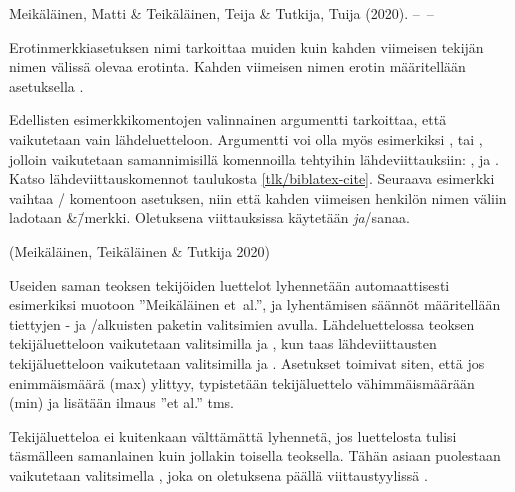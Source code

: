 \begin{koodilohkosis}
\end{koodilohkosis}

\begin{tulossis}
  Meikäläinen, Matti \& Teikäläinen, Teija \& Tutkija, Tuija (2020).
  --~--
\end{tulossis}

Erotinmerkkiasetuksen nimi  tarkoittaa muiden
kuin kahden viimeisen tekijän nimen välissä olevaa erotinta. Kahden
viimeisen nimen erotin määritellään asetuksella
.

Edellisten esimerkkikomentojen valinnainen argumentti 
tarkoittaa, että vaikutetaan vain lähdeluetteloon. Argumentti voi olla
myös esimerkiksi ,  tai ,
jolloin vaikutetaan samannimisillä komennoilla tehtyihin
lähdeviittauksiin: ,  ja
. Katso lähdeviittauskomennot taulukosta
\ref{tlk/biblatex-cite}. Seuraava esimerkki vaihtaa
\-/ komentoon asetuksen, niin että kahden viimeisen
henkilön nimen väliin ladotaan \&\=/merkki. Oletuksena viittauksissa
käytetään \textit{ja}\-/sanaa.

\begin{koodilohkosis}
\end{koodilohkosis}

\begin{tulossis}
  (Meikäläinen, Teikäläinen \& Tutkija 2020)
\end{tulossis}

Useiden saman teoksen tekijöiden luettelot lyhennetään automaattisesti
esimerkiksi muotoon ''Meikäläinen et~al.'', ja lyhentämisen säännöt
määritellään tiettyjen - ja \-/alkuisten paketin
valitsimien avulla. Lähdeluettelossa teoksen tekijäluetteloon
vaikutetaan valitsimilla  ja
, kun taas lähdeviittausten tekijäluetteloon
vaikutetaan valitsimilla  ja
. Asetukset toimivat siten, että jos
enimmäismäärä (max) ylittyy, typistetään tekijäluettelo vähimmäismäärään
(min) ja lisätään ilmaus ''et al.'' tms.

Tekijäluetteloa ei kuitenkaan välttämättä lyhennetä, jos luettelosta
tulisi täsmälleen samanlainen kuin jollakin toisella teoksella. Tähän
asiaan puolestaan vaikutetaan valitsimella , joka on
oletuksena päällä viittaustyylissä .

